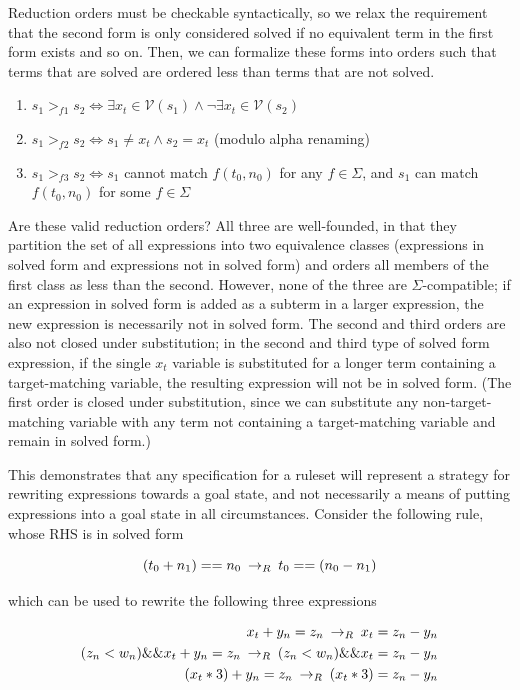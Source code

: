 Reduction orders must be checkable syntactically, so we relax the requirement that the second form is only considered solved if no equivalent term in the first form exists and so on. Then, we can formalize these forms into orders such that terms that are solved are ordered less than terms that are not solved.

\begin{enumerate}
    \item $s_1 >_{f1} s_2 \iff \exists x_t \in \mathcal{V}(s_1) \wedge \neg \exists x_t \in \mathcal{V}(s_2)$
    \item $s_1 >_{f2} s_2 \iff s_1 \neq x_t \wedge s_2 = x_t$ (modulo alpha renaming)
    \item $s_1 >_{f3} s_2 \iff s_1$ cannot match $f(t_0, n_0)$ for any $f \in \Sigma$, and $s_1$ can match $f(t_0, n_0)$ for some $f \in \Sigma$
\end{enumerate}

Are these valid reduction orders? All three are well-founded, in that they partition the set of all expressions into two equivalence classes (expressions in solved form and expressions not in solved form) and orders all members of the first class as less than the second. However, none of the three are $\Sigma$-compatible; if an expression in solved form is added as a subterm in a larger expression, the new expression is necessarily not in solved form. The second and third orders are also not closed under substitution; in the second and third type of solved form expression, if the single $x_t$ variable is substituted for a longer term containing a target-matching variable, the resulting expression will not be in solved form. (The first order is closed under substitution, since we can substitute any non-target-matching variable with any term not containing a target-matching variable and remain in solved form.)

This demonstrates that any specification for a ruleset will represent a strategy for rewriting expressions towards a goal state, and not necessarily a means of putting expressions into a goal state in all circumstances. Consider the following rule, whose RHS is in solved form

\[ (t_0 + n_1) == n_0 \:\rightarrow_{R}\: t_0 == (n_0 - n_1)
\]

which can be used to rewrite the following three expressions

\begin{align*}
x_t + y_n = z_n \:\rightarrow_{R}\: x_t = z_n - y_n \\
(z_n < w_n) \&\& x_t + y_n = z_n \:\rightarrow_{R}\: (z_n < w_n) \&\& x_t = z_n - y_n \\
(x_t * 3) + y_n = z_n \:\rightarrow_{R}\: (x_t * 3) = z_n - y_n 
\end{align*}

